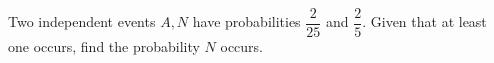 Two independent events $A,N$ have probabilities $\dfrac{2}{25}$ and $\dfrac{2}{5}$. Given that at least one occurs, find the probability $N$ occurs.
